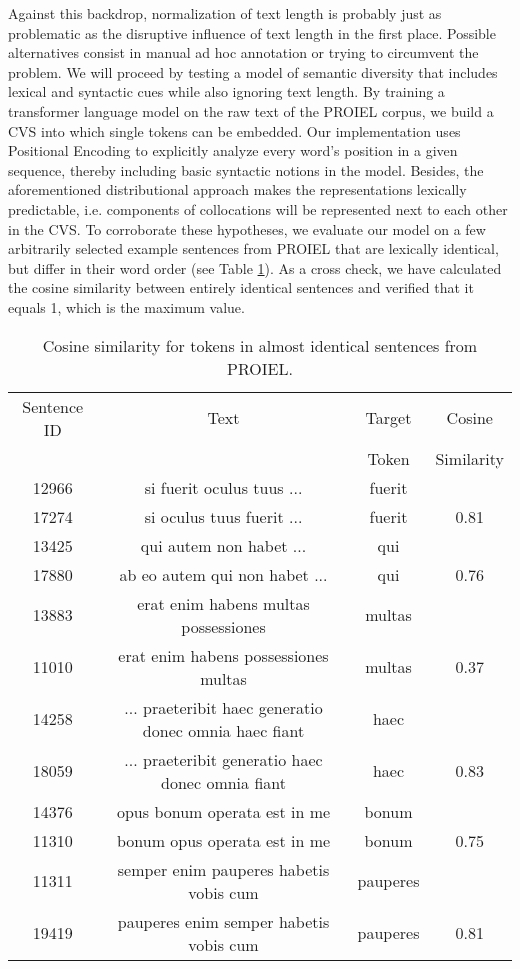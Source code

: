 \documentclass[runningheads]{llncs}
\begin{document}
Against this backdrop, normalization of text length is probably just as problematic as the disruptive influence of text length in the first place. Possible alternatives consist in manual ad hoc annotation or trying to circumvent the problem. We will proceed by testing a model of semantic diversity that includes lexical and syntactic cues while also ignoring text length. By training a transformer language model \parencite[9]{vaswaniAttentionAllYou2017} on the raw text of the PROIEL corpus, we build a \gls{CVS} into which single tokens can be embedded. Our implementation uses Positional Encoding \parencite[4]{lampleCrosslingualLanguageModel2019} to explicitly analyze every word's position in a given sequence, thereby including basic syntactic notions in the model. Besides, the aforementioned distributional approach makes the representations lexically predictable, i.e. components of collocations will be represented next to each other in the \gls{CVS}. To corroborate these hypotheses, we evaluate our model on a few arbitrarily selected example sentences from PROIEL that are lexically identical, but differ in their word order (see Table \ref{tableCosSimWordOrder}). As a cross check, we have calculated the cosine similarity between entirely identical sentences and verified that it equals 1, which is the maximum value.
\begin{table}[ht]
	\begin{tabular}{ c | c | c | c }
  		Sentence ID & Text & Target & Cosine \\ 
		 & & Token & Similarity \\ \hline
  		12966 & si fuerit oculus tuus ... & fuerit & \\
		17274 & si oculus tuus fuerit ... & fuerit & 0.81 \\ \hline
		13425 & qui autem non habet ... & qui & \\
		17880 & ab eo autem qui non habet ... & qui & 0.76 \\ \hline
		13883 & erat enim habens multas possessiones & multas & \\
		11010 & erat enim habens possessiones multas & multas & 0.37 \\ \hline
		14258 & ... praeteribit haec generatio donec omnia haec fiant & haec & \\
		18059 & ... praeteribit generatio haec donec omnia fiant & haec & 0.83 \\ \hline
		14376 & opus bonum operata est in me & bonum & \\
		11310 & bonum opus operata est in me & bonum & 0.75 \\ \hline
		11311 & semper enim pauperes habetis vobis cum & pauperes & \\
		19419 & pauperes enim semper habetis vobis cum & pauperes & 0.81 \\ \hline
	\end{tabular}
	\caption{Cosine similarity for tokens in almost identical sentences from PROIEL.}
	\label{tableCosSimWordOrder}
\end{table}
\end{document}

